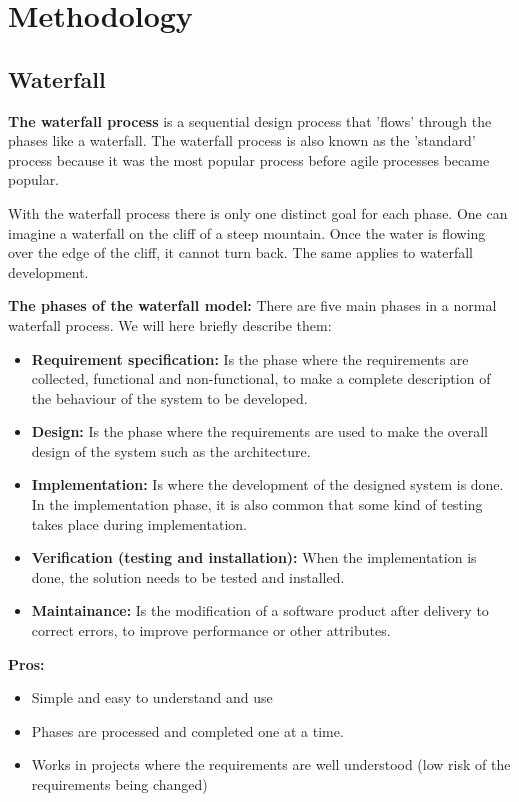 \section{Methodology}

\subsection{Waterfall}

{\bf The waterfall process } is a sequential design process that 'flows' through the phases like a waterfall.
The waterfall process is also known as the 'standard' process because it was the most popular process before
agile processes became popular. 

With the waterfall process there is only one distinct goal for each phase. One can imagine a waterfall on the cliff of a steep mountain. Once the water is flowing over the edge of the cliff, it cannot turn back. The same applies to waterfall development. \cite{wikiWaterfall, techtargetWaterfall}

{\bf The phases of the waterfall model:} There are five main phases in a normal waterfall process. We will here briefly
describe them:
\begin{itemize}
	\item {\bf Requirement specification:} Is the phase where the requirements are collected, functional and non-functional, to make a complete description of the behaviour of the system to be developed.
	\item {\bf Design: } Is the phase where the requirements are used to make the overall design of the system such as the
	architecture.
	\item {\bf Implementation:} Is where the development of the designed system is done. In the implementation phase, 
	it is also common that some kind of testing takes place during implementation.
	\item {\bf Verification (testing and installation): } When the implementation is done, the solution needs to be tested and installed.
	\item {\bf Maintainance:} Is the modification of a software product after delivery to correct errors, to improve performance or other attributes.
\end{itemize}

{\bf Pros: }
\begin{itemize}
	\item Simple and easy to understand and use
	\item Phases are processed and completed one at a time.
	\item Works in projects where the requirements are well understood (low risk of the requirements being changed)
\end{itemize}

